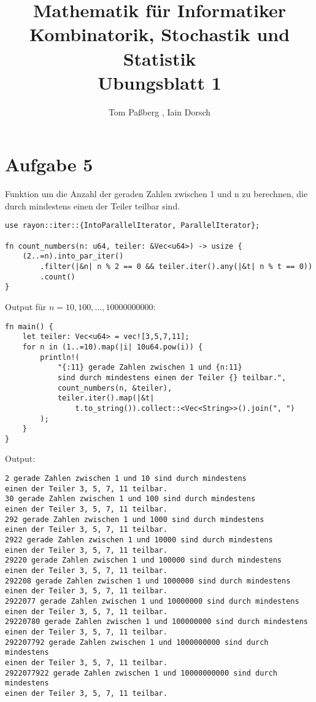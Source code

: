 \documentclass[a4paper]{scrartcl}
\title{Mathematik für Informatiker \\ Kombinatorik, Stochastik und Statistik \\ Ubungsblatt 1}
\author{Tom Paßberg , Iain Dorsch}
\date{}
\begin{document}
\maketitle

\newpage
\section*{Aufgabe 5}
Funktion um die Anzahl der geraden Zahlen zwischen 1 und n zu berechnen, die durch mindestens einen der Teiler teilbar sind.
\begin{lstlisting}
use rayon::iter::{IntoParallelIterator, ParallelIterator};

fn count_numbers(n: u64, teiler: &Vec<u64>) -> usize {
    (2..=n).into_par_iter()
        .filter(|&n| n % 2 == 0 && teiler.iter().any(|&t| n % t == 0))
        .count()
}  
\end{lstlisting}

Output für $ n = 10, 100 , \ldots, 10000000000 $:

\begin{lstlisting}
fn main() {
    let teiler: Vec<u64> = vec![3,5,7,11];
    for n in (1..=10).map(|i| 10u64.pow(i)) {
        println!(
            "{:11} gerade Zahlen zwischen 1 und {n:11} 
            sind durch mindestens einen der Teiler {} teilbar.", 
            count_numbers(n, &teiler), 
            teiler.iter().map(|&t| 
                t.to_string()).collect::<Vec<String>>().join(", ")
        );
    }  
} 
\end{lstlisting}

Output:

\begin{lstlisting}
2 gerade Zahlen zwischen 1 und 10 sind durch mindestens 
einen der Teiler 3, 5, 7, 11 teilbar.
30 gerade Zahlen zwischen 1 und 100 sind durch mindestens 
einen der Teiler 3, 5, 7, 11 teilbar.
292 gerade Zahlen zwischen 1 und 1000 sind durch mindestens 
einen der Teiler 3, 5, 7, 11 teilbar.
2922 gerade Zahlen zwischen 1 und 10000 sind durch mindestens 
einen der Teiler 3, 5, 7, 11 teilbar.
29220 gerade Zahlen zwischen 1 und 100000 sind durch mindestens 
einen der Teiler 3, 5, 7, 11 teilbar.
292208 gerade Zahlen zwischen 1 und 1000000 sind durch mindestens 
einen der Teiler 3, 5, 7, 11 teilbar.
2922077 gerade Zahlen zwischen 1 und 10000000 sind durch mindestens 
einen der Teiler 3, 5, 7, 11 teilbar.
29220780 gerade Zahlen zwischen 1 und 100000000 sind durch mindestens 
einen der Teiler 3, 5, 7, 11 teilbar.
292207792 gerade Zahlen zwischen 1 und 1000000000 sind durch mindestens 
einen der Teiler 3, 5, 7, 11 teilbar.
2922077922 gerade Zahlen zwischen 1 und 10000000000 sind durch mindestens 
einen der Teiler 3, 5, 7, 11 teilbar.
\end{lstlisting}      
\end{document}
